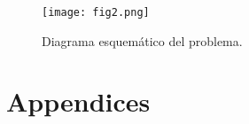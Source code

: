 \documentclass[10pt,a4paper]{article}
\begin{document}


\begin{figure}[h]
\centering
\texttt{[image: fig2.png]}
\caption{Diagrama esquemático del problema.}
\end{figure}

\appendix
{}
\section*{Appendices}


\end{document}
